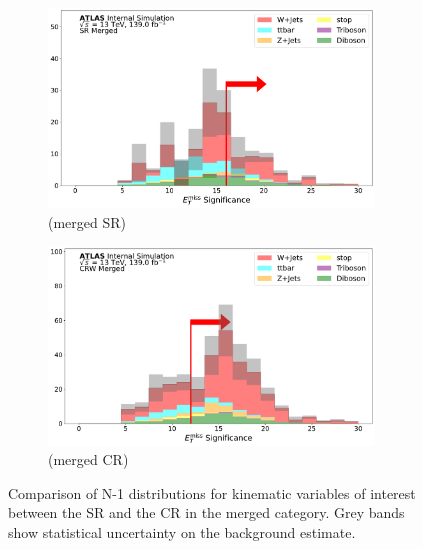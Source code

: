 \begin{figure}[htbp]
 \begin{subfigure}{0.45\textwidth}
     \includegraphics[width = 0.95\textwidth]{Figures/App_SR_CR_distributions/SR1L_Merged/MetTST_Significance_N_1.pdf}
    \caption{\metsig (merged SR)}
     \end{subfigure}
    \begin{subfigure}{0.45\textwidth}
     \includegraphics[width = 0.95\textwidth]{Figures/App_SR_CR_distributions/CRW_Merged/MetTST_Significance_N_1.pdf}
     \caption{\metsig (merged \wjets CR)}
     \end{subfigure}
     
     \caption[Comparison of N-1 distributions for kinematic variables of interest between the signal region and the \wjets control region in the merged category.]{Comparison of N-1 distributions for kinematic variables of interest between the SR and the \wjets CR in the merged category. Grey bands show statistical uncertainty on the background estimate.}
     \label{fig:N_1_CRW_merged}
  \end{figure}
  
  \captionsetup[figure]{list=no}
  
